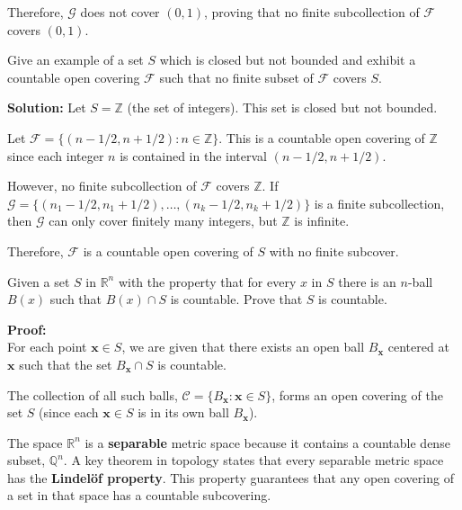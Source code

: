 Therefore, $\mathcal{G}$ does not cover $(0,1)$, proving that no finite subcollection of $\mathcal{F}$ covers $(0,1)$.

\begin{problembox}
Give an example of a set \( S \) which is closed but not bounded and exhibit a countable open covering \( \mathcal{F} \) such that no finite subset of \( \mathcal{F} \) covers \( S \).
\end{problembox}

\textbf{Solution:} Let $S = \mathbb{Z}$ (the set of integers). This set is closed but not bounded.

Let $\mathcal{F} = \{(n-1/2, n+1/2) : n \in \mathbb{Z}\}$. This is a countable open covering of $\mathbb{Z}$ since each integer $n$ is contained in the interval $(n-1/2, n+1/2)$.

However, no finite subcollection of $\mathcal{F}$ covers $\mathbb{Z}$. If $\mathcal{G} = \{(n_1-1/2, n_1+1/2), \ldots, (n_k-1/2, n_k+1/2)\}$ is a finite subcollection, then $\mathcal{G}$ can only cover finitely many integers, but $\mathbb{Z}$ is infinite.

Therefore, $\mathcal{F}$ is a countable open covering of $S$ with no finite subcover.

\begin{problembox}
Given a set \( S \) in \( \mathbb{R}^n \) with the property that for every \( x \) in \( S \) there is an \( n \)-ball \( B(x) \) such that \( B(x) \cap S \) is countable. Prove that \( S \) is countable.
\end{problembox}

\textbf{Proof:}\\
For each point $\mathbf{x} \in S$, we are given that there exists an open ball $B_\mathbf{x}$ centered at $\mathbf{x}$ such that the set $B_\mathbf{x} \cap S$ is countable.

The collection of all such balls, $\mathcal{C} = \{B_\mathbf{x} : \mathbf{x} \in S\}$, forms an open covering of the set $S$ (since each $\mathbf{x} \in S$ is in its own ball $B_\mathbf{x}$).

The space $\mathbb{R}^n$ is a \textbf{separable} metric space because it contains a countable dense subset, $\mathbb{Q}^n$. A key theorem in topology states that every separable metric space has the \textbf{Lindelöf property}. This property guarantees that any open covering of a set in that space has a countable subcovering.

